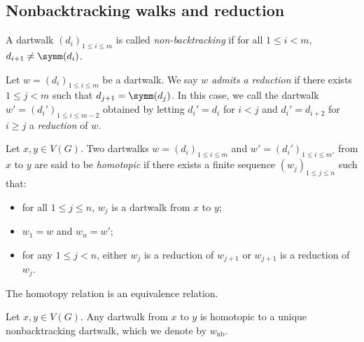\subsection{Nonbacktracking walks and reduction}

\begin{definition}
  \label{def:nonbacktracking}
  A dartwalk $(d_i)_{1 \leq i \leq m}$ is called \emph{non-backtracking} if
  for all $1 \leq i < m$, $d_{i+1} \neq \symm (d_{i})$.
\end{definition}

\begin{definition}
  \label{def:walk_reduction}
  Let $w = (d_i)_{1 \leq i \leq m}$ be a dartwalk.
  We say $w$ \emph{admits a reduction} if there exists $1 \leq j < m$ such that
  $d_{j+1} = \symm(d_j)$.
  In this case, we call the dartwalk $w'=(d_i')_{1 \leq i \leq m-2}$ obtained by
  letting $d_i'=d_i$ for $i<j$ and $d_i'=d_{i+2}$ for $i \geq j$ a \emph{reduction} of $w$.
\end{definition}

\begin{definition}
  \label{def:homotopy}
  Let $x, y \in V(G)$.
  Two dartwalks $w = (d_i)_{1 \leq i \leq m}$ and $w' = (d_i')_{1 \leq i \leq m'}$ from $x$ to $y$
  are said to be \emph{homotopic} if
  there exists a finite sequence $(w_j)_{1 \leq j \leq n}$ such that:
  \begin{itemize}
    \item for all $1 \leq j \leq n$, $w_j$ is a
    dartwalk from $x$ to $y$;
    \item $w_1=w$ and $w_n=w'$;
    \item for any $1 \leq j < n$, either $w_j$ is a reduction of $w_{j+1}$ or $w_{j+1}$ is a
    reduction of $w_j$.
  \end{itemize}
\end{definition}

\begin{proposition}
  \label{prop:homotopy_equivalence}
  The homotopy relation is an equivalence relation.
\end{proposition}

\begin{theorem}
  \label{thm:unique_nonbacktracking}
  Let $x, y \in V(G)$.
  Any dartwalk from $x$ to $y$ is homotopic to a unique nonbacktracking dartwalk, which we denote by
  $w_{\mathrm{nb}}$.
\end{theorem}

